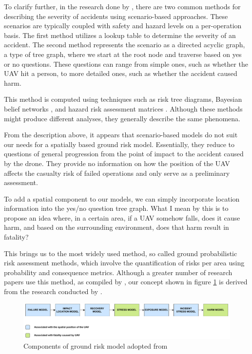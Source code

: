 \documentclass[12pt]{report}
\begin{document}
        To clarify further, in the research done by \cite{ancel_real-time_2017}, there are two common methods for
        describing the severity of accidents using scenario-based approaches. These scenarios are typically coupled with
        safety and hazard levels on a per-operation basis. The first method utilizes a lookup table to determine the
        severity of an accident. The second method represents the scenario as a directed acyclic graph, a type of tree
        graph, where we start at the root node and traverse based on yes or no questions. These questions can range from
        simple ones, such as whether the UAV hit a person, to more detailed ones, such as whether the accident caused
        harm.
            
        This method is computed using techniques such as risk tree diagrams, Bayesian belief networks
        \cite{ancel_real-time_2017}, and hazard risk assessment matrices \cite{barr_preliminary_2017}. Although these
        methods might produce different analyses, they generally describe the same phenomena.
            
        From the description above, it appears that scenario-based models do not suit our needs for a spatially based
        ground risk model. Essentially, they reduce to questions of general progression from the point of impact to the
        accident caused by the drone. They provide no information on how the position of the UAV affects the casualty
        risk of failed operations and only serve as a preliminary assessment.
            
        To add a spatial component to our models, we can simply incorporate location information into the yes/no
        question tree graph. What I mean by this is to propose an idea where, in a certain area, if a UAV somehow falls,
        does it cause harm, and based on the surrounding environment, does that harm result in fatality?
            
        This brings us to the most widely used method, so called ground probabilistic risk assessment methods, which
        involve the quantification of risks per area using probability and consequence metrics. Although a greater
        number of research papers use this method, as compiled by \cite{washington_review_2017}, our concept shown in
        figure \ref{fig:prime_example} is derived from the research conducted by \cite{primatesta_ground_2020}. 

        \begin{figure}[H]
            \centering
            \includegraphics[width=\textwidth]{General Image/OSM Drone-GROUND.pdf}
            \caption{Components of ground risk model adopted from \protect\cite{primatesta_ground_2020}}
            \label{fig:prime_example}
        \end{figure}
\end{document}

